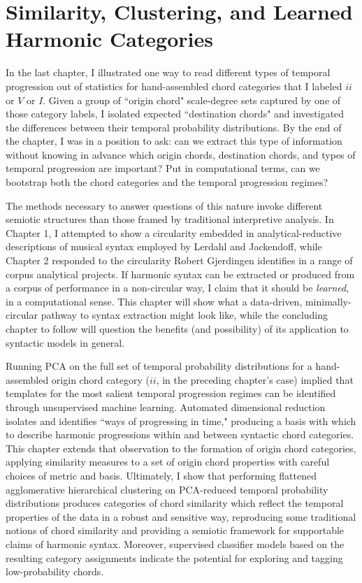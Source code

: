 \chapter{Similarity, Clustering, and Learned Harmonic Categories}
In the last chapter, I illustrated one way to read different types of temporal progression out of statistics for hand-assembled chord categories that I labeled $ii$ or $V$ or $I$.  Given a group of ``origin chord" scale-degree sets captured by one of those category labels, I isolated expected ``destination chords" and investigated the differences between their temporal probability distributions.  By the end of the chapter, I was in a position to ask: can we extract this type of information without knowing in advance which origin chords, destination chords, and types of temporal progression are important?  Put in computational terms, can we bootstrap both the chord categories and the temporal progression regimes?

The methods necessary to answer questions of this nature invoke different semiotic structures than those framed by traditional interpretive analysis.  In Chapter 1, I attempted to show a circularity embedded in analytical-reductive descriptions of musical syntax employed by Lerdahl and Jackendoff, while Chapter 2 responded to the circularity Robert Gjerdingen identifies in a range of corpus analytical projects.  If harmonic syntax can be extracted or produced from a corpus of performance in a non-circular way, I claim that it should be \emph{learned}, in a computational sense.  This chapter will show what a data-driven, minimally-circular pathway to syntax extraction might look like, while the concluding chapter to follow will question the benefits (and possibility) of its application to syntactic models in general.

Running PCA on the full set of temporal probability distributions for a hand-assembled origin chord category ($ii$, in the preceding chapter's case) implied that templates for the most salient temporal progression regimes can be identified through unsupervised machine learning.  Automated dimensional reduction isolates and identifies ``ways of progressing in time," producing a basis with which to describe harmonic progressions within and between syntactic chord categories.  This chapter extends that observation to the formation of origin chord categories, applying similarity measures to a set of origin chord properties with careful choices of metric and basis.  Ultimately, I show that performing flattened agglomerative hierarchical clustering on PCA-reduced temporal probability distributions produces categories of chord similarity which reflect the temporal properties of the data in a robust and sensitive way, reproducing some traditional notions of chord similarity and providing a semiotic framework for supportable claims of harmonic syntax.  Moreover, supervised classifier models based on the resulting category assignments indicate the potential for exploring and tagging low-probability chords.

